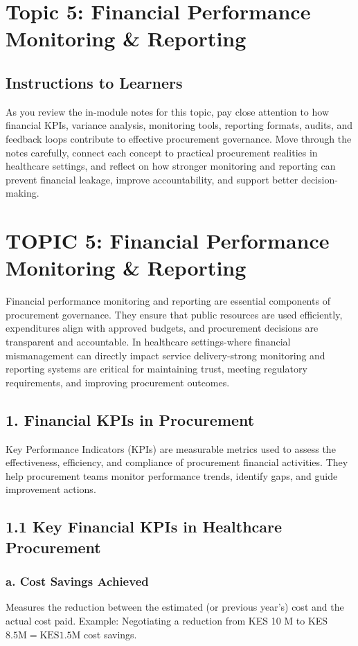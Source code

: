 \documentclass[10pt]{article}
\begin{document}
\section*{Topic 5: Financial Performance Monitoring \& Reporting}
\subsection*{Instructions to Learners}
As you review the in-module notes for this topic, pay close attention to how financial KPIs, variance analysis, monitoring tools, reporting formats, audits, and feedback loops contribute to effective procurement governance. Move through the notes carefully, connect each concept to practical procurement realities in healthcare settings, and reflect on how stronger monitoring and reporting can prevent financial leakage, improve accountability, and support better decision-making.

\section*{TOPIC 5: Financial Performance Monitoring \& Reporting}
Financial performance monitoring and reporting are essential components of procurement governance. They ensure that public resources are used efficiently, expenditures align with approved budgets, and procurement decisions are transparent and accountable. In healthcare settings-where financial mismanagement can directly impact service delivery-strong monitoring and reporting systems are critical for maintaining trust, meeting regulatory requirements, and improving procurement outcomes.

\subsection*{1. Financial KPIs in Procurement}
Key Performance Indicators (KPIs) are measurable metrics used to assess the effectiveness, efficiency, and compliance of procurement financial activities. They help procurement teams monitor performance trends, identify gaps, and guide improvement actions.

\subsection*{1.1 Key Financial KPIs in Healthcare Procurement}
\subsubsection*{a. Cost Savings Achieved}
Measures the reduction between the estimated (or previous year's) cost and the actual cost paid. Example: Negotiating a reduction from KES 10 M to KES $8.5 \mathrm{M}=\mathrm{KES} 1.5 \mathrm{M}$ cost savings.
\end{document}
